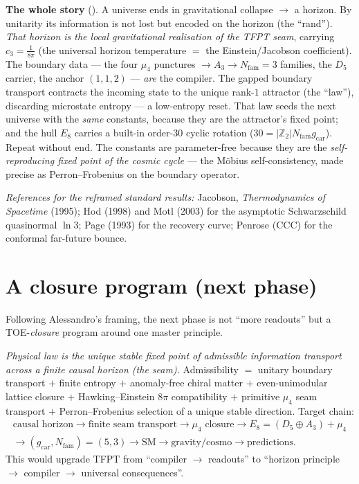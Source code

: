 \documentclass[11pt,a4paper]{article}
\newcommand{\cthree}{c_3}
\newcommand{\gcar}{g_{\mathrm{car}}}
\newcommand{\Nfam}{N_{\mathrm{fam}}}
\newcommand{\Z}{\mathbb Z}
\begin{document}
\par\smallskip\noindent\textbf{The whole story} (\mC).
A universe ends in gravitational collapse $\to$ a horizon. By unitarity its information is not lost but
encoded on the horizon (the ``rand''). \emph{That horizon is the local gravitational realisation of the
TFPT seam}, carrying $\cthree=\tfrac1{8\pi}$ (the universal horizon temperature $=$ the Einstein/Jacobson
coefficient). The boundary data --- the four
$\mu_4$ punctures $\to A_3\to\Nfam{=}3$ families, the $D_5$ carrier, the anchor $(1,1,2)$ --- \emph{are} the
compiler. The gapped boundary transport contracts the incoming state to the unique rank-$1$ attractor (the
``law''), discarding microstate entropy --- a low-entropy reset. That law seeds the next universe with the
\emph{same} constants, because they are the attractor's fixed point; and the hull $E_8$ carries a built-in
order-$30$ cyclic rotation ($30=|\Z_2|\Nfam\gcar$). Repeat without end. The constants are parameter-free
because they are the \emph{self-reproducing fixed point of the cosmic cycle} --- the M\"obius
self-consistency, made precise as Perron--Frobenius on the boundary operator.

\noindent\emph{References for the reframed standard results:} Jacobson, \textit{Thermodynamics of Spacetime}
(1995); Hod (1998) and Motl (2003) for the asymptotic Schwarzschild quasinormal $\ln3$; Page (1993) for the
recovery curve; Penrose (CCC) for the conformal far-future bounce.

\section{A closure program (next phase) \mO}\label{sec:program}
Following Alessandro's framing, the next phase is not ``more readouts'' but a TOE-\emph{closure} program
around one master principle.

\begin{keybox}
\emph{Physical law is the unique stable fixed point of admissible information transport across a finite
causal horizon (the seam).} Admissibility $=$ unitary boundary transport $+$ finite entropy $+$ anomaly-free
chiral matter $+$ even-unimodular lattice closure $+$ Hawking--Einstein $8\pi$ compatibility $+$ primitive
$\mu_4$ seam transport $+$ Perron--Frobenius selection of a unique stable direction. Target chain:
\[
  \begin{gathered}
  \text{causal horizon}\to\text{finite seam transport}\to\mu_4\text{ closure}\to E_8{=}(D_5{\oplus}A_3){+}\mu_4\\[2pt]
  \to(\gcar,\Nfam){=}(5,3)\to\text{SM}\to\text{gravity/cosmo}\to\text{predictions}.
  \end{gathered}
\]
This would upgrade TFPT from ``compiler $\to$ readouts'' to ``horizon principle $\to$ compiler $\to$ universal
consequences''.
\end{keybox}
\end{document}
